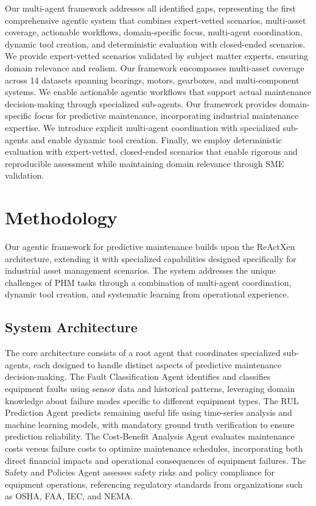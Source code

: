 \documentclass[conference]{IEEEtran}
\begin{document}
Our multi-agent framework addresses all identified gaps, representing the first comprehensive agentic system that combines expert-vetted scenarios, multi-asset coverage, actionable workflows, domain-specific focus, multi-agent coordination, dynamic tool creation, and deterministic evaluation with closed-ended scenarios. We provide expert-vetted scenarios validated by subject matter experts, ensuring domain relevance and realism. Our framework encompasses multi-asset coverage across 14 datasets spanning bearings, motors, gearboxes, and multi-component systems. We enable actionable agentic workflows that support actual maintenance decision-making through specialized sub-agents. Our framework provides domain-specific focus for predictive maintenance, incorporating industrial maintenance expertise. We introduce explicit multi-agent coordination with specialized sub-agents and enable dynamic tool creation. Finally, we employ deterministic evaluation with expert-vetted, closed-ended scenarios that enable rigorous and reproducible assessment while maintaining domain relevance through SME validation.

\section{Methodology}

Our agentic framework for predictive maintenance builds upon the ReActXen architecture, extending it with specialized capabilities designed specifically for industrial asset management scenarios. The system addresses the unique challenges of PHM tasks through a combination of multi-agent coordination, dynamic tool creation, and systematic learning from operational experience.

\subsection{System Architecture}

The core architecture consists of a root agent that coordinates specialized sub-agents, each designed to handle distinct aspects of predictive maintenance decision-making. The Fault Classification Agent identifies and classifies equipment faults using sensor data and historical patterns, leveraging domain knowledge about failure modes specific to different equipment types. The RUL Prediction Agent predicts remaining useful life using time-series analysis and machine learning models, with mandatory ground truth verification to ensure prediction reliability. The Cost-Benefit Analysis Agent evaluates maintenance costs versus failure costs to optimize maintenance schedules, incorporating both direct financial impacts and operational consequences of equipment failures. The Safety and Policies Agent assesses safety risks and policy compliance for equipment operations, referencing regulatory standards from organizations such as OSHA, FAA, IEC, and NEMA.
\end{document}
